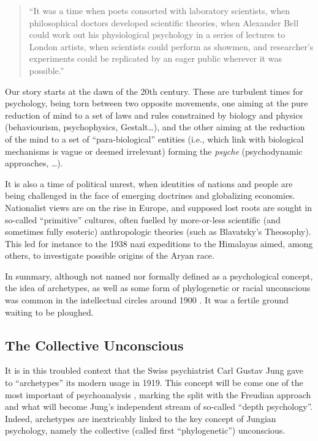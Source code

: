 \documentclass[
]{book}
\begin{document}
\begin{quote}
``It was a time when poets consorted with laboratory scientists,
when philosophical doctors developed scientific theories,
when Alexander Bell could work out his physiological psychology in a series of lectures to London artists,
when scientists could perform as showmen,
and researcher's experiments could be replicated by an eager public wherever it was possible.'' \citep{richardson2001british}
\end{quote}

Our story starts at the dawn of the 20th century. These are turbulent times for psychology, being torn between two opposite movements, one aiming at the pure reduction of mind to a set of laws and rules constrained by biology and physics (behaviourism, psychophysics, Gestalt\ldots), and the other aiming at the reduction of the mind to a set of ``para-biological'' entities (i.e., which link with biological mechanisms is vague or deemed irrelevant) forming the \emph{psyche} (psychodynamic approaches, \ldots).

It is also a time of political unrest, when identities of nations and people are being challenged in the face of emerging doctrines and globalizing economies. Nationalist views are on the rise in Europe, and supposed lost roots are sought in so-called ``primitive'' cultures, often fuelled by more-or-less scientific (and sometimes fully esoteric) anthropologic theories (such as Blavatsky's Theosophy). This led for instance to the 1938 nazi expeditions to the Himalayas aimed, among others, to investigate possible origins of the Aryan race.

In summary, although not named nor formally defined as a psychological concept, the idea of archetypes, as well as some form of phylogenetic or racial unconscious was common in the intellectual circles around 1900 \citep{shamdasani2003cult}. It was a fertile ground waiting to be ploughed.

\hypertarget{the-collective-unconscious}{%
\subsection{The Collective Unconscious}\label{the-collective-unconscious}}

It is in this troubled context that the Swiss psychiatrist Carl Gustav Jung gave to ``archetypes'' its modern usage in 1919. This concept will be come one of the most important of psychoanalysis \citep{roesler2012archetypes}, marking the split with the Freudian approach and what will become Jung's independent stream of so-called ``depth psychology''. Indeed, archetypes are inextricably linked to the key concept of Jungian psychology, namely the collective (called first ``phylogenetic'') unconscious.
\end{document}
